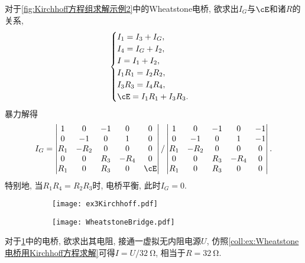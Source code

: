 \documentclass[../Electromagnetism.tex]{subfiles}
\begin{document}
\begin{ex}
	\label{ex:Wheatstone电桥用Kirchhoff方程求解}
	对于\cref{fig:Kirchhoff方程组求解示例2}中的Wheatstone电桥, 欲求出$I_G$与$\cE$和诸$R$的关系,
	\[ \begin{cases}
		I_1 = I_3 + I_G,\\
		I_4 = I_G + I_2,\\
		I = I_1 + I_2,\\
		I_1 R_1 = I_2 R_2,\\
		I_3 R_3 = I_4 R_4,\\
		\cE = I_1 R_1 + I_3 R_3.
	\end{cases} \]
	暴力解得
	\[ I_G = 
		\begin{vmatrix}
 		1 & 0 & -1 & 0 & 0 \\
 		0 & -1 & 0 & 1 & 0 \\
 		R_1 & -R_2 & 0 & 0 & 0 \\
 		0 & 0 & R_3 & -R_4 & 0 \\
 		R_1 & 0 & R_3 & 0 & \cE \\
		\end{vmatrix}/
		\begin{vmatrix}
 		1 & 0 & -1 & 0 & -1 \\
 		0 & -1 & 0 & 1 & -1 \\
 		R_1 & -R_2 & 0 & 0 & 0 \\
 		0 & 0 & R_3 & -R_4 & 0 \\
 		R_1 & 0 & R_3 & 0 & 0 \\
		\end{vmatrix}.
	\]
	特别地, 当$R_1 R_4 = R_2 R_3$时, 电桥平衡, 此时$I_G = 0$.
\end{ex}
\begin{figure}
	\centering
	\begin{subfigure}[b]{.45\textwidth}	
		\centering
		\texttt{[image: ex3Kirchhoff.pdf]}
		\caption{}
		\label{fig:Kirchhoff方程组求解示例3}
	\end{subfigure}	
	\begin{subfigure}[b]{.53\textwidth}
		\centering
		\texttt{[image: WheatstoneBridge.pdf]}
		\caption{}
		\label{fig:Wheatstone电桥变换为适用Thevenin定理的情形}
	\end{subfigure}
	\caption{}
\end{figure}
\begin{ex}
	对于\cref{fig:Kirchhoff方程组求解示例3}中的电桥, 欲求出其电阻, 接通一虚拟无内阻电源$U$, 仿照\cref{coll:ex:Wheatstone电桥用Kirchhoff方程求解}可得$I = U/\SI{32}{\ohm}$, 相当于$R=\SI{32}{\ohm}$.
\end{ex}
\end{document}

